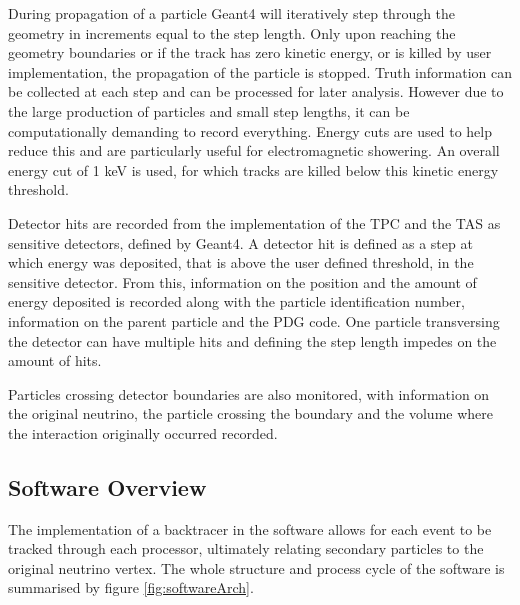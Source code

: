 During propagation of a particle Geant4 will iteratively step through the geometry in increments equal to the step length. Only upon reaching the geometry boundaries or if the track has zero kinetic energy, or is killed by user implementation, the propagation of the particle is stopped. Truth information can be collected at each step and can be processed for later analysis. However due to the large production of particles and small step lengths, it can be computationally demanding to record everything. Energy cuts are used to help reduce this and are particularly useful for electromagnetic showering. An overall energy cut of 1 keV is used, for which tracks are killed below this kinetic energy threshold.

Detector hits are recorded from the implementation of the TPC and the TAS as sensitive detectors, defined by Geant4. A detector hit is defined as a step at which energy was deposited, that is above the user defined threshold, in the sensitive detector. From this, information on the position and the amount of energy deposited is recorded along with the particle identification number, information on the parent particle and the PDG code. One particle transversing the detector can have multiple hits and defining the step length impedes on the amount of hits.

Particles crossing detector boundaries are also monitored, with information on the original neutrino, the particle crossing the boundary and the volume where the interaction originally occurred recorded.

\subsection{Software Overview}
The implementation of a backtracer in the software allows for each event to be tracked through each processor, ultimately relating secondary particles to the original neutrino vertex. The whole structure and process cycle of the software is summarised by figure \ref{fig:softwareArch}.

